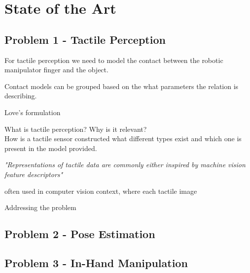 
\chapter{State of the Art} \label{ch:state-of-the-art}

\section{Problem 1 - Tactile Perception} \label{sec:lit-rev-problem-1}

For tactile perception we need to model the contact between the robotic manipulator finger and the object.


Contact models can be grouped based on the what parameters the relation is describing.















Love's formulation 




What is tactile perception? Why is it relevant? \\
How is a tactile sensor constructed \cite{recent-progress-in-technologies-for-tactile-sensors}
what different types exist and which one is present in the model provided.


\textit{"Representations of tactile data are commonly either inspired by machine vision feature descriptors"}

often used in computer vision context, where each tactile image 

Addressing the problem 





\section{Problem 2 - Pose Estimation} \label{sec:lit-rev-problem-2}

\section{Problem 3 - In-Hand Manipulation} \label{sec:lit-rev-problem-3}